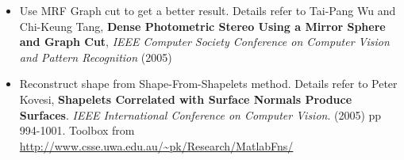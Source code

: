 \documentclass [12pt] {article}
\begin{document}
\begin{itemize}
  \item Use MRF Graph cut to get a better result. Details refer to Tai-Pang Wu and Chi-Keung Tang, \textbf{Dense Photometric Stereo Using a Mirror Sphere and Graph Cut}, \emph{IEEE Computer Society Conference on Computer Vision and Pattern Recognition} (2005)

  \item Reconstruct shape from Shape-From-Shapelets method. Details refer to Peter Kovesi, \textbf{Shapelets Correlated with Surface Normals Produce Surfaces}. \emph{IEEE International Conference on Computer Vision}. (2005) pp 994-1001. Toolbox from \url{http://www.csse.uwa.edu.au/~pk/Research/MatlabFns/}

\end{itemize}
\end{document}
